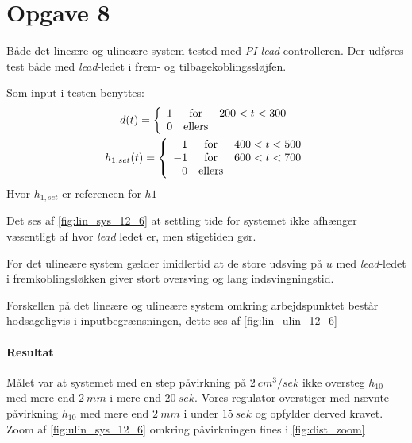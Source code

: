 \section{Opgave 8}
Både det lineære og ulineære system tested med \emph{PI-lead} controlleren.
Der udføres test både med \emph{lead}-ledet i frem- og tilbagekoblingssløjfen.

Som input i testen benyttes:
\begin{gather*}
d(t) = \left\{\begin{array}{r c l}
1 & \mbox{for} & 200<t<300\\
0 & \mbox{ellers} & 
\end{array}\right.\\
h_{1, set}(t) = \left\{\begin{array}{r c l}
 1 & \mbox{for} & 400<t<500\\
-1 & \mbox{for} & 600<t<700\\
 0 & \mbox{ellers} & 
\end{array}\right.\\
\end{gather*}
Hvor $h_{1, set}$ er referencen for $h1$

Det ses af \ref{fig:lin_sys_12_6} at settling tide for systemet ikke afhænger
væsentligt af hvor \emph{lead} ledet er, men stigetiden gør.

For det ulineære system gælder imidlertid at de store udsving på $u$ med
\emph{lead}-ledet i fremkoblingsløkken giver stort oversving og lang
indsvingningstid.

Forskellen på det lineære og ulineære system omkring arbejdspunktet består
hodsageligvis i inputbegrænsningen, dette ses af \ref{fig:lin_ulin_12_6}

\paragraph{Resultat}
	Målet var at systemet med en step påvirkning på $2~cm^3/sek$ ikke oversteg
	$h_{10}$ med mere end $2~mm$ i mere end $20~sek$. Vores regulator overstiger
	med nævnte påvirkning $h_{10}$ med mere end $2~mm$ i under $15~sek$ og opfylder derved
	kravet. Zoom af \ref{fig:ulin_sys_12_6} omkring påvirkningen fines i
	\ref{fig:dist_zoom}




